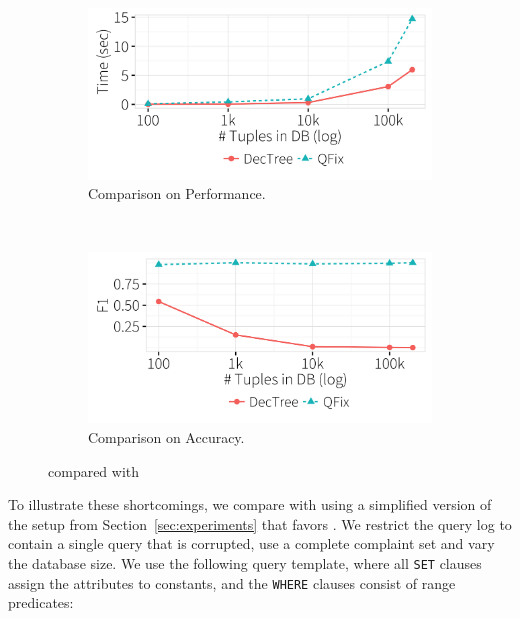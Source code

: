   \begin{figure}[h!]
  \centering
    \begin{subfigure} [t]{.75\columnwidth}
    \includegraphics[width = \columnwidth]{figures/heuristictime}
    \caption{Comparison on Performance.}
    \label{f:heuristic_time} 
    \end{subfigure}\\

    \begin{subfigure} [t]{.75\columnwidth}
    \includegraphics[width = \columnwidth]{figures/heuristicacc}
    \caption{Comparison on Accuracy.}
    \label{f:heuristic_acc} 
    \end{subfigure}
   \caption{\dt compared with \sys}
   \label{f:heuristic}
  \end{figure}


To illustrate these shortcomings, we compare \dt with \sys using a simplified version of the setup from Section~\ref{sec:experiments} that favors \dt.
We restrict the query log to contain a single query that is corrupted, use a complete complaint set  and vary the database size.
We use the following query template, where all \texttt{SET} clauses assign the attributes to constants,
and the \texttt{WHERE} clauses consist of range predicates:

